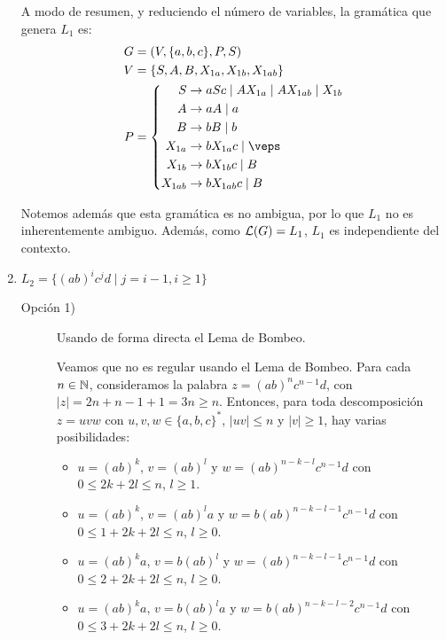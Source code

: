 \begin{ejercicio}
\begin{enumerate}
        A modo de resumen, y reduciendo el número de variables, la gramática que genera $L_1$ es:
        \begin{equation*}
            \begin{aligned}
                G &= (V,\{a,b,c\},P,S) \\
                V &= \{ S, A, B, X_{1a}, X_{1b}, X_{1ab} \} \\
                P &= \left\{
                    \begin{aligned}
                        S &\rightarrow aSc \mid A X_{1a} \mid A X_{1ab} \mid X_{1b}\\
                        A &\rightarrow aA \mid a\\
                        B &\rightarrow bB \mid b\\
                        X_{1a} &\rightarrow bX_{1a}c \mid \veps\\
                        X_{1b} &\rightarrow bX_{1b}c \mid B\\
                        X_{1ab} &\rightarrow bX_{1ab}c \mid B
                    \end{aligned}
                \right.
            \end{aligned}
        \end{equation*}
        
        Notemos además que esta gramática es no ambigua, por lo que $L_1$ no es inherentemente ambiguo. Además, como $\mathcal{L}(G)=L_1$, $L_1$ es independiente del contexto.

        \item $L_2 = \{ (ab)^i c^j d \mid j = i - 1, i \geq 1 \}$
        
        \begin{description}
            \item[Opción 1)] Usando de forma directa el Lema de Bombeo.
            
            Veamos que no es regular usando el Lema de Bombeo. Para cada $n\in \mathbb{N}$, consideramos la palabra $z=(ab)^{n}c^{n-1}d$, con $|z|=2n+n-1+1=3n\geq n$. Entonces, para toda descomposición $z=uvw$ con $u,v,w\in \{a,b,c\}^*$, $|uv|\leq n$ y $|v|\geq 1$, hay varias posibilidades:
            \begin{itemize}
                \item $u=(ab)^k$, $v=(ab)^l$ y $w=(ab)^{n-k-l}c^{n-1}d$ con $0\leq 2k+2l\leq n$, $l\geq 1$.
                \item $u=(ab)^k$, $v=(ab)^la$ y $w=b(ab)^{n-k-l-1}c^{n-1}d$ con $0\leq 1+2k+2l\leq n$, $l\geq 0$.
                \item $u=(ab)^k a$, $v=b(ab)^l$ y $w=(ab)^{n-k-l-1}c^{n-1}d$ con $0\leq 2+2k+2l\leq n$, $l\geq 0$.
                \item $u=(ab)^k a$, $v=b(ab)^la$ y $w=b(ab)^{n-k-l-2}c^{n-1}d$ con $0\leq 3+2k+2l\leq n$, $l\geq 0$.
            \end{itemize}


\end{description}
\end{enumerate}
\end{ejercicio}

